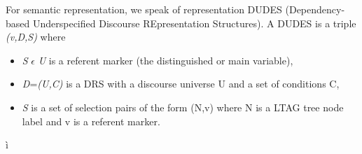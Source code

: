 For semantic representation, we speak of representation DUDES (Dependency-based Underspecified Discourse REpresentation Structures).
A DUDES is a triple  \textit{(v,D,S)} where 
\begin{itemize} 
  \item  \textit{S} \begin{math}\epsilon \end{math} \textit{U} is a referent marker (the distinguished or main variable),
  \item \textit{D}=\textit{(U,C)} is a DRS with a discourse universe U and a set of conditions C, 
  \item  \textit{S} is a set of selection pairs of the form (N,v) where N is a LTAG tree node label and v is
a referent marker.
\end{itemize} 

ì
